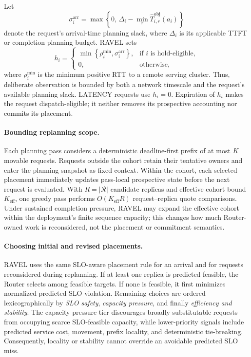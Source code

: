 \documentclass[letterpaper,twocolumn,10pt]{article}
\begin{document}
Let
\[
\sigma_i^{\mathrm{arr}}
=
\max\!\left\{
0,\,
\Delta_i-
\min_r\widehat{T}^{\mathrm{obj}}_{i,r}(a_i)
\right\}
\]
denote the request's arrival-time planning slack, where $\Delta_i$ is its
applicable TTFT or completion planning budget.
RAVEL sets
\begin{equation}
    h_i
    =
    \begin{cases}
        \min\!\left\{
            \rho_i^{\min},
            \sigma_i^{\mathrm{arr}}
        \right\},
        & \text{if $i$ is hold-eligible},\\
        0,
        & \text{otherwise},
    \end{cases}
    \label{eq:ravel-mobility-hold}
\end{equation}
where $\rho_i^{\min}$ is the minimum positive RTT to a remote serving cluster.
Thus, deliberate observation is bounded by both a network timescale and the
request's available planning slack.
LATENCY requests use $h_i=0$.
Expiration of $h_i$ makes the request dispatch-eligible; it neither removes
its prospective accounting nor commits its placement.

\paragraph{Bounding replanning scope.}
Each planning pass considers a deterministic deadline-first prefix of at most
$K$ movable requests.
Requests outside the cohort retain their tentative owners and enter the
planning snapshot as fixed context.
Within the cohort, each selected placement immediately updates pass-local
prospective state before the next request is evaluated.
With $R=|\mathcal{R}|$ candidate replicas and effective cohort bound
$K_{\mathrm{eff}}$, one greedy pass performs
$O(K_{\mathrm{eff}}R)$ request--replica quote comparisons.
Under sustained completion pressure, RAVEL may expand the effective cohort
within the deployment's finite sequence capacity; this changes how much
Router-owned work is reconsidered, not the placement or commitment semantics.

\paragraph{Choosing initial and revised placements.}
RAVEL uses the same SLO-aware placement rule for an arrival and for requests
reconsidered during replanning.
If at least one replica is predicted feasible, the Router selects among
feasible targets.
If none is feasible, it first minimizes normalized predicted SLO violation.
Remaining choices are ordered lexicographically by
\emph{SLO safety}, \emph{capacity pressure}, and finally
\emph{efficiency and stability}.
The capacity-pressure tier discourages broadly substitutable requests from
occupying scarce SLO-feasible capacity, while lower-priority signals include
predicted service cost, movement, prefix locality, and deterministic
tie-breaking.
Consequently, locality or stability cannot override an avoidable predicted
SLO miss.
\end{document}
